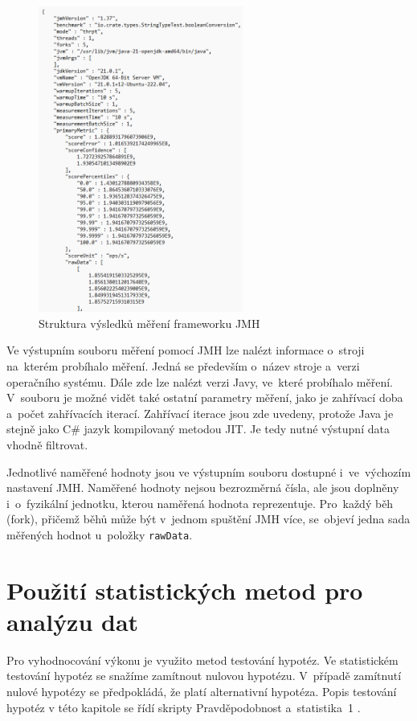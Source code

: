 \begin{figure}[!ht]
    \centering
    \includegraphics[width=0.6\textwidth]{../img/JMH-example.png}
    \caption{Struktura výsledků měření frameworku JMH}
\end{figure}

Ve výstupním souboru měření pomocí JMH lze nalézt informace o~stroji na~kterém probíhalo měření.
Jedná se především o~název stroje a~verzi operačního systému. Dále zde lze nalézt verzi Javy,
ve~které probíhalo měření. V~souboru je možné vidět také ostatní parametry měření, jako je
zahřívací doba a~počet zahřívacích iterací. Zahřívací iterace jsou zde uvedeny, protože Java
je stejně jako C\# jazyk kompilovaný metodou JIT. Je tedy nutné výstupní data vhodně filtrovat.

Jednotlivé naměřené hodnoty jsou ve výstupním souboru dostupné i~ve~výchozím nastavení JMH.
Naměřené hodnoty nejsou bezrozměrná čísla, ale jsou doplněny i~o~fyzikální jednotku,
kterou naměřená hodnota reprezentuje. Pro~každý běh (fork), přičemž běhů může být v~jednom
spuštění JMH více, se~objeví jedna sada měřených hodnot u~položky \lstinline|rawData|.

\section{Použití statistických metod pro analýzu dat}

Pro vyhodnocování výkonu je využito metod testování hypotéz. Ve statistickém testování
hypotéz se snažíme zamítnout nulovou hypotézu. V~případě zamítnutí nulové hypotézy
se předpokládá, že platí alternativní hypotéza. Popis testování hypotéz v této kapitole
se řídí skripty Pravděpodobnost a~statistika~1 \cite[]{samal_nmai059_nodate}.

